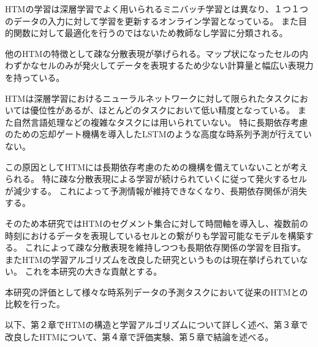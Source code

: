 HTMの学習は深層学習でよく用いられるミニバッチ学習とは異なり、１つ１つのデータの入力に対して学習を更新するオンライン学習となっている。
また目的関数に対して最適化を行うのではないため教師なし学習に分類される。

他のHTMの特徴として疎な分散表現が挙げられる。マップ状になったセルの内わずかなセルのみが発火してデータを表現するため少ない計算量と幅広い表現力を持っている。

HTMは深層学習におけるニューラルネットワークに対して限られたタスクにおいては優位性があるが、ほとんどのタスクにおいて低い精度となっている。
また自然言語処理などの複雑なタスクには用いられていない。
特に長期依存考慮のための忘却ゲート機構を導入したLSTM\cite{lstm_forget_gate}のような高度な時系列予測が行えていない。

この原因としてHTMには長期依存考慮のための機構を備えていないことが考えられる。
特に疎な分散表現による学習が続けられていくに従って発火するセルが減少する。
これによって予測情報が維持できなくなり、長期依存関係が消失する。

そのため本研究ではHTMのセグメント集合に対して時間軸を導入し、複数前の時刻におけるデータを表現しているセルとの繋がりも学習可能なモデルを構築する。
これによって疎な分散表現を維持しつつも長期依存関係の学習を目指す。
またHTMの学習アルゴリズムを改良した研究というものは現在挙げられていない。
これを本研究の大きな貢献とする。

本研究の評価として様々な時系列データの予測タスクにおいて従来のHTMとの比較を行った。

以下、第２章でHTMの構造と学習アルゴリズムについて詳しく述べ、第３章で改良したHTMについて、第４章で評価実験、第５章で結論を述べる。
